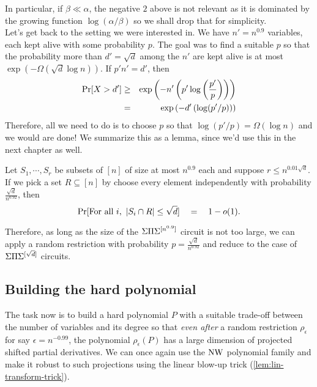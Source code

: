 \noindent In particular, if $\beta \ll \alpha$, the negative $2$ above is not relevant as it is dominated by the growing function $\log(\alpha/\beta)$ so we shall drop that for simplicity.\\

Let's get back to the setting we were interested in.
We have $n' = n^{0.9}$ variables, each kept alive with some probability $p$.
The goal was to find a suitable $p$ so that the probability more than $d' = \sqrt{d}$ among the $n'$ are kept alive is at most $\exp(-\Omega(\sqrt{d} \log n))$. If $p'n' =  d'$, then
\begin{eqnarray*}
\Pr[X > d'] & \geq & \exp\left(-n' \left(p'\log\left(\frac{p'}{p}\right)\right)\right)\\
 & = & \exp\left(-d'\left(\log(p'/p)\right)\right)
\end{eqnarray*}
Therefore, all we need to do is to choose $p$ so that $\log(p'/p) = \Omega(\log n)$ and we would are done!
We summarize this as a lemma, since we'd use this in the next chapter as well.

\begin{lemma}\label{lem:single-step-fanin-reduction}
Let $S_1,\cdots, S_r$ be subsets of $[n]$ of size at most $n^{0.9}$ each and suppose $r \leq n^{0.01 \sqrt{d}}$. If we pick a set $R \subseteq [n]$ by choose every element independently with probability $\frac{\sqrt{d}}{n^{0.92}}$, then
\[
\Pr[\text{For all $i$, } \left|S_i \cap R\right| \leq \sqrt{d}] \quad = \quad 1 - o(1).
\]
\end{lemma}

Therefore, as long as the size of the $\Sigma\Pi\Sigma^{[n^{0.9}]}$ circuit is not too large, we can apply a random restriction with probability $p = \frac{\sqrt{d}}{n^{0.92}}$ and reduce to the case of $\Sigma\Pi\Sigma^{[\sqrt{d}]}$ circuits. 

\subsection{Building the hard polynomial}

The task now is to build a hard polynomial $P$ with a suitable trade-off between the number of variables and its degree so that  \emph{even after} a random restriction $\rho_\epsilon$ for say $\epsilon = n^{-0.99}$, the polynomial $\rho_\epsilon(P)$ has a large dimension of projected shifted partial derivatives. We can once again use the $\operatorname{\mathrm{NW}}$ polynomial family and make it robust to such projections using the linear blow-up trick (\autoref{lem:lin-transform-trick}). 

